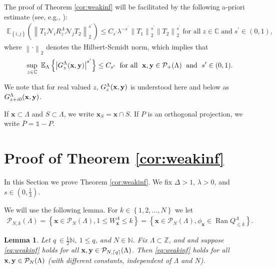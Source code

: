 \documentclass[12pt, a4paper,reqno]{amsart}
\numberwithin{equation}{section}
\newtheorem{lemma}[theorem]{Lemma}
\DeclareMathOperator{\Ran}{Ran}
\newcommand\N{\mathbb N}
\newcommand\C{\mathbb C}
\newcommand\Z{\mathbb Z}
\newcommand\x{\mathbf{x}}
\newcommand\E{\mathbb E}
\newcommand\cN{\mathcal{N}}
\newcommand\cP{\mathcal{P}}
\newcommand{\pr}{\prime}
\newcommand\be{\begin{equation}\begin{aligned}}
\newcommand\ee{\end{aligned}\end{equation}}
\newcommand{\abs}[1]{\left\lvert #1 \right\rvert}
\newcommand{\norm}[1]{\left\lVert #1 \right\rVert}
\newcommand{\set}[1]{\left\{ #1 \right\}}
\newcommand{\pa}[1]{\left( #1 \right)}
\newcommand{\cl}[1]{\lceil #1 \rceil}
\newcommand\La{\Lambda}
\newcommand{\eq}[1]{\eqref{#1}}
\newcommand{\mqtx}[1]{\; \ \text{#1}\; \  }
\newcommand{\sqtx}[1]{\;\text{#1}\;}
\newcommand{\ident}{\mathds{1}}
\begin{document}
The proof of Theorem \ref{cor:weakinf}  will be facilitated by
the following    a-priori estimate (see, e.g., \cite[Lemma 3.4]{EK22}):
 \be\label{eq:weak1-1a} 
\E_{\set{i,j}}\pa{\norm{T_1\cN_iR_z^\Lambda\cN_j T_2}_{2}^{s^\pr}}  \le
{C_{s^\pr}} \lambda^{-{s^\pr}}\norm{T_1}^{s^\pr}_{2}\norm{T_2}^{s^\pr}_{2} \sqtx{for all} z\in \C \sqtx{and} {s^\pr}\in (0,1) ,
\ee 
where  $\norm{ \cdot}_2$ denotes the Hilbert-Scmidt norm, which
implies that 
\be \label{eq:weak1-1} 
 \sup_{z\in\C}\ \E_{ \La}\set{\abs{G^{ \La}_{z}({\bf x},{\bf y})}^{s^\pr}}\le C_{s^\pr} \mqtx{for all}  {\bf x},{\bf y}\in \cP_+(\La)  \mqtx{and} {s^\pr}\in (0,1).
 \ee
 
 We note that for real valued $z$, $G^ \La_{z}({\bf x},{\bf y})$ is understood here and below as $G^ \La_{z+ i0}({\bf x},{\bf y})$.  



If $\x \subset \La$ and $S\subset \La$,  we write $\x_S=  \x \cap S$.  If $P$ is an orthogonal projection, we write $\bar P= \ident  - P$.







\section{Proof of Theorem \ref{cor:weakinf}}
\label{sec:proofs}

In this Section we prove Theorem \ref{cor:weakinf}.   We fix  $\Delta >1$, $\lambda >0$, and  $s\in (0,\frac 13)$.

 We will use the following lemma. For 
$k \in \set{1,2,\ldots,N}$ we let
 \be
 \cP_{N,k}(\La)=\set{\x\in \cP_N(\La), 1\le W_\x^\La  \le k}=  \set{\x\in \cP_N(\La), \phi_\x \in \Ran Q^\Lambda_{\le k}}.
 \ee



\begin{lemma}\label{lemweakstrong}
Let $q\ \in  \frac 12 \N$, $1\le q $, and  $N\in \N$.  Fix $\La \subset \Z$, and and suppose  \eq{eq:weakinf} holds for all  ${\bf x},{\bf y}\in \cP_{N,\cl{q}}(\La)$.  Then \eq{eq:weakinf} holds for all ${\bf x},{\bf y}\in \cP_{N}(\La)$ (with different constants, independent of $\La$ and $N$).
\end{lemma}
\end{document}
